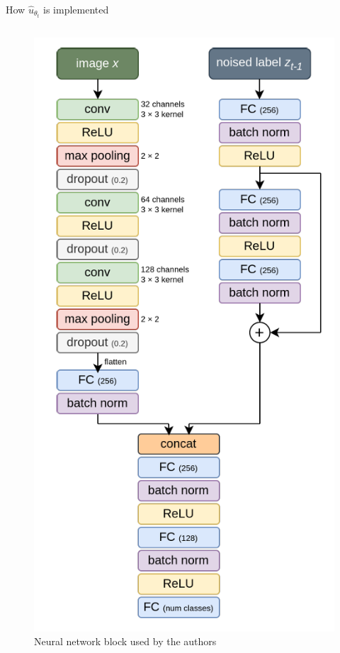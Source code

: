 \documentclass{beamer}
\begin{document}
\begin{frame}{How $\hat u_{\theta_t}$ is implemented}
\begin{columns}[T]
  \begin{column}{0.5\textwidth}
    {%
      \setlength{\abovecaptionskip}{0pt}%
      \setlength{\belowcaptionskip}{0pt}%
      \setlength{\intextsep}{0pt}%
      \setlength{\textfloatsep}{0pt}%
      \setlength{\floatsep}{0pt}%
      \vspace{-1.2\baselineskip}%
      \begin{figure}[t] %
        \centering
        \includegraphics[width=0.6\linewidth]{NN.png}
        \caption{Neural network block used by the authors}
        \label{fig:placeholder}
      \end{figure}%
    }%
  \end{column}

\end{columns}

\end{frame}
\end{document}
